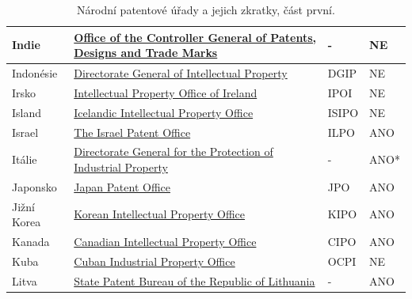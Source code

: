 \begin{table}[H]
\begin{tabular}{|>{\centering\arraybackslash}p{2.2cm}|>{\centering\arraybackslash}p{7.5cm}|>{\centering\arraybackslash}p{2cm}|>{\centering\arraybackslash}p{1cm}|}
	\hline
	Indie & \href{http://www.ipindia.nic.in/}{Office of the Controller General of Patents, Designs and Trade Marks}  & -    & NE    \\ 
	\hline
	Indonésie & \href{http://www.dgip.go.id/}{Directorate General of Intellectual Property}  & DGIP & NE        \\ 
	\hline
	Irsko & \href{https://www.ipoi.gov.ie/en/}{Intellectual Property Office of Ireland}  & IPOI   & NE      \\ 
	\hline
	Island & \href{https://www.isipo.is/}{Icelandic Intellectual Property Office}  & ISIPO    & NE     \\ 
	\hline
	Israel & \href{https://www.gov.il/en/departments/ilpo}{The Israel Patent Office}  & ILPO    & ANO     \\ 
	\hline
	Itálie & \href{https://uibm.mise.gov.it/index.php/it/}{Directorate General for the Protection of Industrial Property}  & -    & ANO*     \\ 
	\hline
	Japonsko & \href{https://www.jpo.go.jp/e/index.html}{Japan Patent Office}  & JPO  & ANO       \\ 
	\hline
	Jižní Korea & \href{http://www.kipo.go.kr/}{Korean Intellectual Property Office}  & KIPO   & ANO      \\ 
	\hline	
	Kanada & \href{https://www.ic.gc.ca/}{Canadian Intellectual Property Office}  & CIPO  & ANO      \\ 
	\hline
	Kuba & \href{http://www.ocpi.cu}{Cuban Industrial Property Office}  & OCPI   & NE      \\ 
	\hline
	Litva & \href{http://vpb.lrv.lt/en/}{State Patent Bureau of the Republic of Lithuania}  & -    & ANO     \\
	\hline
	\end{tabular}
	\caption{Národní patentové úřady a jejich zkratky, část první.}
	\label{tab:table_offices1}
	\end{table}
\newpage
